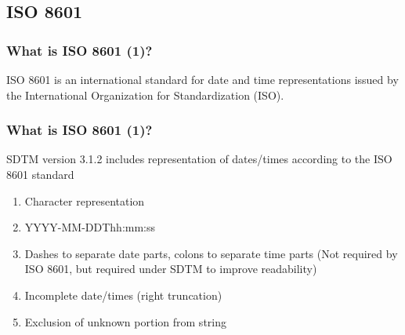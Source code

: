 \documentclass{beamer}
\begin{document}
%

\subsection[ISO 8601]{ISO 8601}

\begin{frame}
	\frametitle{What is ISO 8601 (1)?}

	\begin{definition}
		\alert{ISO 8601} is an international standard for date and time representations issued by the
		      International Organization for Standardization (ISO). 
	\end{definition}
	
\end{frame}


\begin{frame}
	\frametitle{What is ISO 8601 (1)?}

	SDTM version 3.1.2 includes representation of dates/times according to the ISO 8601 standard
	
	\begin{enumerate}
		\item Character representation
		\item YYYY-MM-DD\alert{T}hh:mm:ss
		\item Dashes to separate date parts, colons to separate time parts 
				(Not required by ISO 8601, but required under SDTM to improve readability)
		\item Incomplete date/times (right truncation)
		\item Exclusion of unknown portion from string
	\end{enumerate}
\end{frame}
\end{document}
